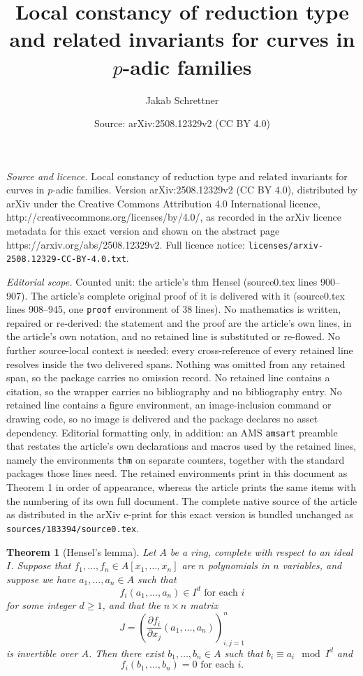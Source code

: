 \documentclass[10pt,a4paper]{amsart}
\title{Local constancy of reduction type and related invariants for curves in $p$-adic families}
\author{Jakab Schrettner}
\date{Source: arXiv:2508.12329v2 (CC BY 4.0)}
\newtheorem{thm}{Theorem}
\begin{document}
\maketitle

\noindent\emph{Source and licence.} Local constancy of reduction type and related invariants for curves in $p$-adic families. Version arXiv:2508.12329v2 (CC BY 4.0), distributed by arXiv under the Creative Commons Attribution 4.0 International licence, http://creativecommons.org/licenses/by/4.0/, as recorded in the arXiv licence metadata for this exact version and shown on the abstract page https://arxiv.org/abs/2508.12329v2. Full licence notice: \texttt{licenses/arxiv-2508.12329-CC-BY-4.0.txt}.\par\smallskip

\noindent\textit{Editorial scope.} Counted unit: the article's thm Hensel (source0.tex lines 900--907). The article's complete original proof of it is delivered with it (source0.tex lines 908--945, one \texttt{proof} environment of 38 lines). No mathematics is written, repaired or re-derived: the statement and the proof are the article's own lines, in the article's own notation, and no retained line is substituted or re-flowed.  No further source-local context is needed: every cross-reference of every retained line resolves inside the two delivered spans.  Nothing was omitted from any retained span, so the package carries no omission record.  No retained line contains a citation, so the wrapper carries no bibliography and no bibliography entry.  No retained line contains a figure environment, an image-inclusion command or drawing code, so no image is delivered and the package declares no asset dependency.  Editorial formatting only, in addition: an AMS \texttt{amsart} preamble that restates the article's own declarations and macros used by the retained lines, namely the environments \texttt{thm} on separate counters, together with the standard packages those lines need.  The retained environments print in this document as Theorem 1 in order of appearance, whereas the article prints the same items with the numbering of its own full document.  The complete native source of the article as distributed in the arXiv e-print for this exact version is bundled unchanged as \texttt{sources/183394/source0.tex}.
	\begin{thm}[Hensel's lemma]\label{Hensel}
		Let $A$ be a ring, complete with respect to an ideal $I$. Suppose that $f_1, \ldots, f_n\in A[x_1, \ldots, x_n]$ are $n$ polynomials in $n$ variables, and suppose we have $a_1, \ldots, a_n\in A$ such that 
		\[f_i(a_1, \ldots, a_n)\in I^d \text{ for each }i\]
		for some integer $d\ge 1$, and that the $n\times n$ matrix
		\[J = \left(\frac{\partial f_i}{\partial x_j}(a_1, \ldots, a_n)\right)_{i,j = 1}^n\]
		is invertible over $A$. Then there exist $b_1, \ldots, b_n\in A$ such that $b_i\equiv a_i \mod I^d$ and 
		\[f_i(b_1, \ldots, b_n) = 0\text{ for each }i.\]
	\end{thm}
\end{document}
